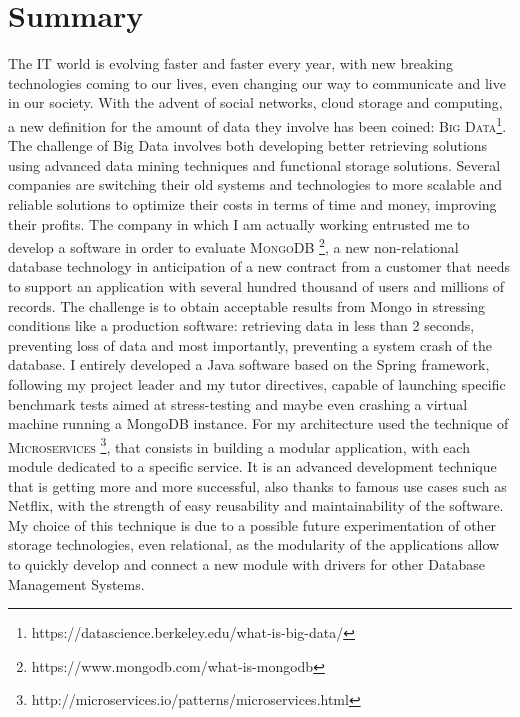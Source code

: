 \chapter*{Summary} %
\label{Summary}


The IT world is evolving faster and faster every year, with new breaking technologies coming to our lives, even changing our way to communicate and live in our society. With the advent of social networks, cloud storage and computing, a new definition for the amount of data they involve has been coined: \textsc{Big Data}\footnote{https://datascience.berkeley.edu/what-is-big-data/}.
The challenge of Big Data involves both developing better retrieving solutions using advanced data mining techniques and functional storage solutions.
Several companies are switching their old systems and technologies to more scalable and reliable solutions to optimize their costs in terms of time and money, improving their profits.
The company in which I am actually working entrusted me to develop a software in order to evaluate \textsc{MongoDB} \footnote{https://www.mongodb.com/what-is-mongodb}, a new non-relational database technology in  anticipation of a new  contract from a customer that needs to support an application with several hundred thousand of users and millions of records.
The challenge is to obtain acceptable results from Mongo in stressing conditions like a production software: retrieving data in less than 2 seconds, preventing loss of data and most importantly, preventing a system crash of the database.
I entirely developed a Java software based on the Spring framework, following my project leader and my tutor directives, capable of launching specific benchmark tests aimed at stress-testing and maybe even crashing a virtual machine running a MongoDB instance.
For my architecture used the technique of \textsc{Microservices} \footnote{http://microservices.io/patterns/microservices.html}, that consists in building a modular application, with each module dedicated to a specific service. It is an advanced development technique that is getting more and more successful, also thanks to famous use cases such as Netflix, with the strength of easy reusability and maintainability of the software.
My choice of this technique is due to a possible future experimentation of other storage technologies, even relational, as the modularity of the applications allow to quickly develop and connect a new module with drivers for other Database Management Systems.
